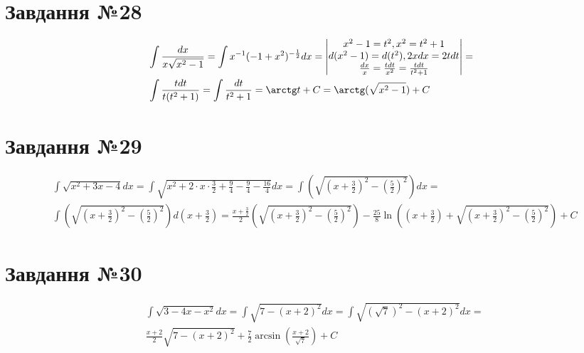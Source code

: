 \documentclass{report}
\begin{document}
\section{Завдання №28}
\begin{equation}\label{eq28}\begin{split}
	& \int \frac{dx}{x\sqrt{x^2 - 1}} = \int x^{-1}(-1 + x^2)^{-\frac{1}{2}}dx = \begin{vmatrix}x^2 - 1= t^2, x^2 = t^2 + 1\\d(x^2 - 1) = d(t^2), 2xdx = 2tdt\\\frac{dx}{x} = \frac{tdt}{x^2} = \frac{tdt}{t^2 + 1}\end{vmatrix} =\\
	& \int\frac{tdt}{t(t^2 + 1)} = \int\frac{dt}{t^2 + 1} = \arctg t + C = \arctg(\sqrt{x^2 - 1}) + C
\end{split}
\end{equation}

\section{Завдання №29}
\begin{equation}\begin{split}
	& \int\sqrt{x^2 + 3x - 4}dx = \int\sqrt{x^2 + 2\cdot x\cdot\frac{3}{2} + \frac{9}{4} - \frac{9}{4} - \frac{16}{4}}dx = \int(\sqrt{(x + \frac{3}{2})^2 - (\frac{5}{2})^2}) dx =\\
	& \int(\sqrt{(x + \frac{3}{2})^2 - (\frac{5}{2})^2}) d(x+\frac{3}{2}) = \frac{x + \frac{3}{2}}{2}(\sqrt{(x + \frac{3}{2})^2 - (\frac{5}{2})^2}) - \frac{25}{8}\ln\left((x + \frac{3}{2}) + \sqrt{(x + \frac{3}{2})^2 - (\frac{5}{2})^2}\right) + C
\end{split}\end{equation}

\section{Завдання №30}
\begin{equation}\begin{split}
	& \int\sqrt{3 - 4x - x^2}dx = \int\sqrt{7 - (x + 2)^2}dx = \int\sqrt{(\sqrt{7})^2 - (x + 2)^2}dx =\\
	& \frac{x + 2}{2}\sqrt{7 - (x + 2)^2} + \frac{7}{2}\arcsin\left(\frac{x + 2}{\sqrt{7}}\right) + C
\end{split}\end{equation}
\end{document}
